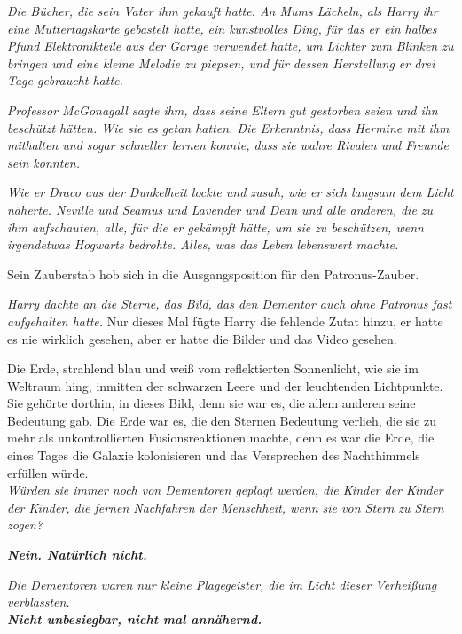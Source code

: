 {\emph{Die Bücher, die sein Vater ihm gekauft hatte. An Mums Lächeln, als Harry ihr eine Muttertagskarte gebastelt hatte, ein kunstvolles Ding, für das er ein halbes Pfund Elektronikteile aus der Garage verwendet hatte, um Lichter zum Blinken zu bringen und eine kleine Melodie zu piepsen, und für dessen Herstellung er drei Tage gebraucht hatte.}

\emph{Professor McGonagall sagte ihm, dass seine Eltern gut gestorben seien und ihn beschützt hätten. Wie sie es getan hatten. Die Erkenntnis, dass Hermine mit ihm mithalten und sogar schneller lernen konnte, dass sie wahre Rivalen und Freunde sein konnten.}

\emph{Wie er Draco aus der Dunkelheit lockte und zusah, wie er sich langsam dem Licht näherte. Neville und Seamus und Lavender und Dean und alle anderen, die zu ihm aufschauten, alle, für die er gekämpft hätte, um sie zu beschützen, wenn irgendetwas Hogwarts bedrohte. Alles, was das Leben lebenswert machte.}

Sein Zauberstab hob sich in die Ausgangsposition für den Patronus-Zauber.

\emph{Harry dachte an die Sterne, das Bild, das den Dementor auch ohne Patronus fast aufgehalten hatte.} Nur dieses Mal fügte Harry die fehlende Zutat hinzu, er hatte es nie wirklich gesehen, aber er hatte die Bilder und das Video gesehen.

Die Erde, strahlend blau und weiß vom reflektierten Sonnenlicht, wie sie im Weltraum hing, inmitten der schwarzen Leere und der leuchtenden Lichtpunkte. Sie gehörte dorthin, in dieses Bild, denn sie war es, die allem anderen seine Bedeutung gab. Die Erde war es, die den Sternen Bedeutung verlieh, die sie zu mehr als unkontrollierten Fusionsreaktionen machte, denn es war die Erde, die eines Tages die Galaxie kolonisieren und das Versprechen des Nachthimmels erfüllen würde.\\

\hfill\break \emph{Würden sie immer noch von Dementoren geplagt werden, die Kinder der Kinder der Kinder, die fernen Nachfahren der Menschheit, wenn sie von Stern zu Stern zogen?}

\hfill\break

\emph{\textbf{Nein. Natürlich nicht.}}

\hfill\break

\emph{Die Dementoren waren nur kleine Plagegeister, die im Licht dieser Verheißung verblassten.\\ \textbf{Nicht unbesiegbar, nicht mal annähernd.}}

}
